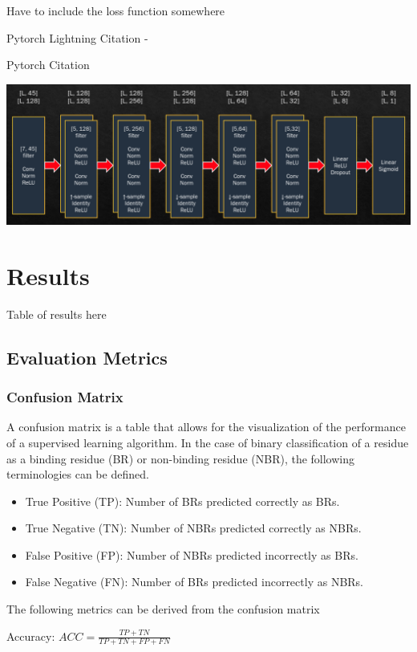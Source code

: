 \documentclass[journal=jacsat,manuscript=article]{achemso}
\begin{document}
Have to include the loss function somewhere

Pytorch Lightning Citation - \cite{falcon2019pytorch}

Pytorch Citation\cite{NEURIPS2019_9015}

\vspace{10 mm}
\noindent\includegraphics[scale=0.39]{architecture}

\section{Results}
\quad Table of results here

\subsection{Evaluation Metrics}
\subsubsection{Confusion Matrix}
A confusion matrix is a table that allows for the visualization of the performance of a supervised learning algorithm. In the case of binary classification of a residue as a binding residue (BR) or non-binding residue (NBR), the following terminologies can be defined.
\begin{itemize}
    \item True Positive (TP): Number of BRs predicted correctly as BRs.
    \item True Negative (TN): Number of NBRs predicted correctly as NBRs.
    \item False Positive (FP): Number of NBRs predicted incorrectly as BRs.
    \item False Negative (FN): Number of BRs predicted incorrectly as NBRs.
\end{itemize}

\noindent The following metrics can be derived from the confusion matrix

Accuracy: ${ACC} = \frac{TP + TN}{TP + TN + FP + FN}$
\end{document}
